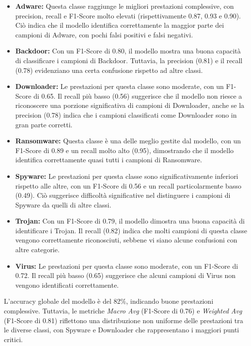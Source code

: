 \begin{itemize}
    \item \textbf{Adware:} Questa classe raggiunge le migliori prestazioni complessive, con precision, recall e F1-Score molto elevati (rispettivamente 0.87, 0.93 e 0.90). Ciò indica che il modello identifica correttamente la maggior parte dei campioni di Adware, con pochi falsi positivi e falsi negativi.
    
    \item \textbf{Backdoor:} Con un F1-Score di 0.80, il modello mostra una buona capacità di classificare i campioni di Backdoor. Tuttavia, la precision (0.81) e il recall (0.78) evidenziano una certa confusione rispetto ad altre classi.
    
    \item \textbf{Downloader:} Le prestazioni per questa classe sono moderate, con un F1-Score di 0.65. Il recall più basso (0.56) suggerisce che il modello non riesce a riconoscere una porzione significativa di campioni di Downloader, anche se la precision (0.78) indica che i campioni classificati come Downloader sono in gran parte corretti.
    
    \item \textbf{Ransomware:} Questa classe è una delle meglio gestite dal modello, con un F1-Score di 0.89 e un recall molto alto (0.95), dimostrando che il modello identifica correttamente quasi tutti i campioni di Ransomware.
    
    \item \textbf{Spyware:} Le prestazioni per questa classe sono significativamente inferiori rispetto alle altre, con un F1-Score di 0.56 e un recall particolarmente basso (0.49). Ciò suggerisce difficoltà significative nel distinguere i campioni di Spyware da quelli di altre classi.
    
    \item \textbf{Trojan:} Con un F1-Score di 0.79, il modello dimostra una buona capacità di identificare i Trojan. Il recall (0.82) indica che molti campioni di questa classe vengono correttamente riconosciuti, sebbene vi siano alcune confusioni con altre categorie.
    
    \item \textbf{Virus:} Le prestazioni per questa classe sono moderate, con un F1-Score di 0.72. Il recall più basso (0.65) suggerisce che alcuni campioni di Virus non vengono identificati correttamente.
\end{itemize}
L'accuracy globale del modello è del 82\%, indicando buone prestazioni complessive. Tuttavia, le metriche \textit{Macro Avg} (F1-Score di 0.76) e \textit{Weighted Avg} (F1-Score di 0.81) riflettono una distribuzione non uniforme delle prestazioni tra le diverse classi, con Spyware e Downloader che rappresentano i maggiori punti critici.

